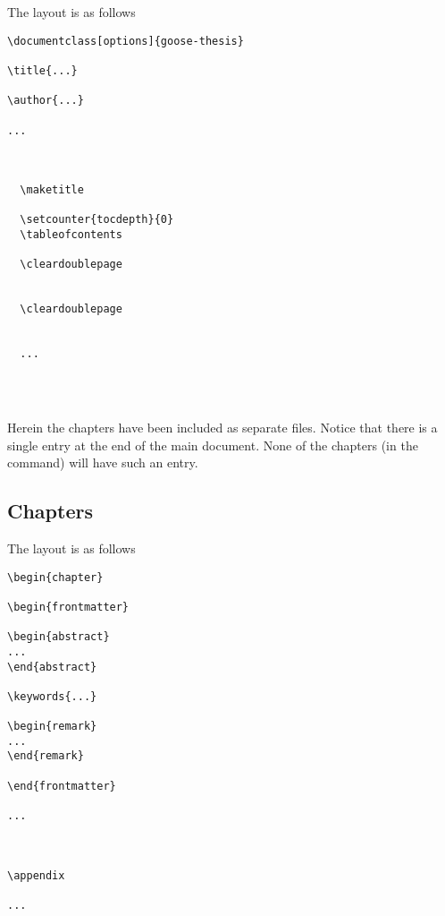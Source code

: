 The layout is as follows
\begin{mdframed}
\begin{verbatim}
\documentclass[options]{goose-thesis}

\title{...}

\author{...}

...



  \maketitle

  \setcounter{tocdepth}{0}
  \tableofcontents

  \cleardoublepage
  

  \cleardoublepage
  

  ...

  


\end{verbatim}
\end{mdframed}

Herein the chapters have been included as separate files. Notice that there is a single \verb|| entry at the end of the main document. None of the chapters (in the \verb|| command) will have such an entry.

\subsection{Chapters}

The layout is as follows
\begin{mdframed}
\begin{verbatim}
\begin{chapter}

\begin{frontmatter}

\begin{abstract}
...
\end{abstract}

\keywords{...}

\begin{remark}
...
\end{remark}

\end{frontmatter}

...



\appendix

...

\end{verbatim}
\end{mdframed}

